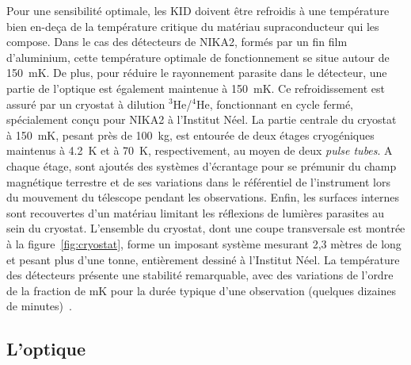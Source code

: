 Pour une sensibilité optimale, les KID doivent être refroidis à une
température bien en-deça de la température critique du matériau
supraconducteur qui les compose. Dans le cas des détecteurs de NIKA2,
formés par un fin film d'aluminium, cette température optimale de
fonctionnement se situe autour de 150~mK. De plus, pour réduire le
rayonnement parasite dans le détecteur, une partie de l'optique est
également maintenue à 150~mK. Ce refroidissement est assuré par
un cryostat à dilution $^3$He/$^4$He, fonctionnant en cycle
fermé, spécialement conçu pour NIKA2 à l'Institut Néel. La partie
centrale du cryostat à 150~mK, pesant près de 100~kg, est entourée de
deux étages cryogéniques maintenus à 4.2~K et à 70~K, respectivement, au
moyen de deux \emph{pulse tubes}. A chaque étage, sont ajoutés des
systèmes d'écrantage pour se prémunir du champ magnétique terrestre et
de ses variations dans le référentiel de l'instrument lors du
mouvement du télescope pendant les observations. Enfin, les surfaces
internes sont recouvertes d'un matériau limitant les réflexions de
lumières parasites au sein du cryostat. L'ensemble du cryostat, dont
une coupe transversale est montrée à la figure~\ref{fig:cryostat}, forme
un imposant système mesurant 2,3 mètres de long et pesant plus d'une
tonne, entièrement dessiné à l'Institut Néel. La température des
détecteurs présente une stabilité remarquable, avec des variations de
l'ordre de la fraction de mK pour la durée typique d'une observation
(quelques dizaines de minutes)~\citep{Adam2018}.

\subsection{L'optique}
\label{se:optics}

